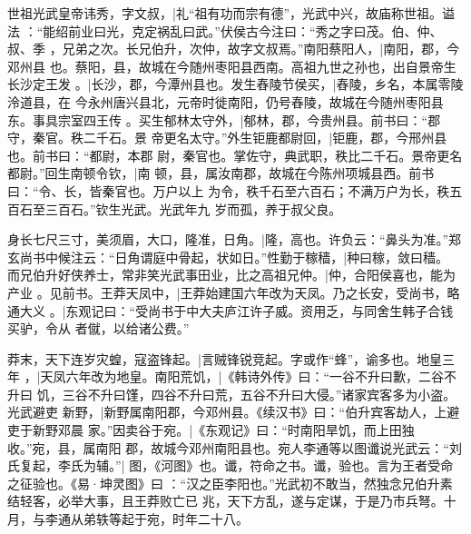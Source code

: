 \documentclass{article}
\begin{document}
\makeatletter
\gezhu@makespecials
\loop
\noindent\hrulefill\par
\the\hsize\par
\begin{withgezhu}
	\parskip=30pt

世祖光武皇帝讳秀，字文叔，|{礼“{祖有功而宗有德}”，光武中兴，故庙称世祖。谥法
：“能绍前业曰光，克定祸乱曰武。”伏侯古今注曰：“秀之字曰茂。伯、仲、叔、季
，兄弟之次。长兄伯升，次仲，故字文叔焉。”}南阳蔡阳人，|{南阳，郡，今邓州县
也。蔡阳，县，故城在今随州枣阳县西南。}高祖九世之孙也，出自景帝生长沙定王发
。|{长沙，郡，今潭州县也。}发生舂陵节侯买，|{舂陵，乡名，本属零陵泠道县，在
今永州唐兴县北，元帝时徙南阳，仍号舂陵，故城在今随州枣阳县东。事具宗室四王传
。}买生郁林太守外，|{郁林，郡，今贵州县。前书曰：“郡守，秦官。秩二千石。景
帝更名太守。”}外生钜鹿都尉回，|{钜鹿，郡，今邢州县也。前书曰：“都尉，本{郡
尉}，秦官也。掌佐守，典武职，秩比二千石。景帝更名都尉。”}回生南顿令钦，|{南
顿，县，属汝南郡，故城在今陈州项城县西。前书曰：“令、长，皆秦官也。万户以上
为令，秩千石至六百石；不满万户为长，秩五百石至三百石。”}钦生光武。光武年九
岁而孤，养于叔父良。

身长七尺三寸，美须眉，大口，隆准，日角。|{隆，高也。许负云：“鼻头为准。”郑
玄尚书中候注云：“日角谓庭中骨起，状如日。”}性勤于稼穑，|{种曰稼，敛曰穑。}
而兄伯升好侠养士，常非笑光武事田业，比之高祖兄仲。|{仲，合阳侯喜也，能为产业
。见前书。}王莽天凤中，|{王莽始建国六年改为天凤。}乃之长安，受尚书，略通大义
。|{东观记曰：“受尚书于中大夫庐江许子威。资用乏，与同舍生韩子合钱买驴，令从
者僦，以给诸公费。”}

莽末，天下连岁灾蝗，寇盗锋起。|{言贼锋锐竞起。字或作“蜂”，谕多也。}地皇三年
，|{天凤六年改为地皇。}南阳荒饥，|{《韩诗外传》曰：“一谷不升曰歉，二谷不升曰
饥，三谷不升曰馑，四谷不升曰荒，五谷不升曰大侵。”}诸家宾客多为小盗。光武避吏
新野，|{新野属南阳郡，今邓州县。《续汉书》曰：“伯升宾客劫人，上避吏于新野邓晨
家。”}因卖谷于宛。|{《东观记》曰：“时南阳旱饥，而上田独收。”宛，县，属南阳
郡，故城今邓州南阳县也。}宛人李通等以图谶说光武云：“刘氏复起，李氏为辅。”|{
图，《河图》也。谶，符命之书。谶，验也。言为王者受命之征验也。《易·坤灵图》曰
：“汉之臣李阳也。”}光武初不敢当，然独念兄伯升素结轻客，必举大事，且王莽败亡已
兆，天下方乱，遂与定谋，于是乃市兵弩。十月，与李通从弟轶等起于宛，时年二十八。


\end{withgezhu}
\end{document}
